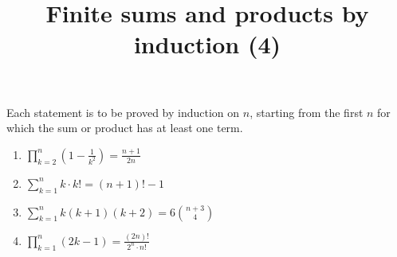 \documentclass[11pt,a4paper]{article}
\title{Finite sums and products by induction (4)}
\author{}
\date{}
\begin{document}
\maketitle
Each statement is to be proved by induction on $n$, starting from the first $n$ for which the sum or product has at least one term.

\begin{enumerate}
\item $\displaystyle \prod_{k=2}^{n} \left(1 - \frac{1}{k^{2}}\right) = \frac{n + 1}{2n}$
\item $\displaystyle \sum_{k=1}^{n} k \cdot k! = \left(n + 1\right)! - 1$
\item $\displaystyle \sum_{k=1}^{n} k\left(k + 1\right)\left(k + 2\right) = 6\binom{n + 3}{4}$
\item $\displaystyle \prod_{k=1}^{n} \left(2k - 1\right) = \frac{\left(2n\right)!}{2^{n} \cdot n!}$
\end{enumerate}
\end{document}
